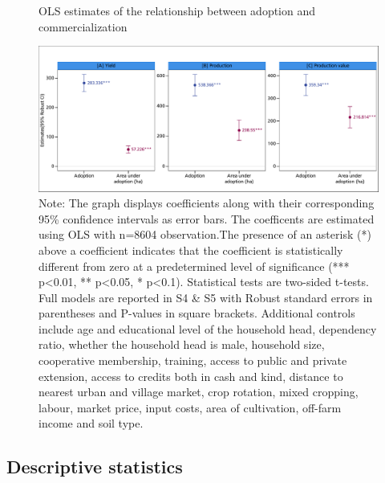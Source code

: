 \documentclass[
]{article}
\begin{document}
\begin{figure}[htbp]
\centering
\caption{OLS estimates of the relationship between adoption and commercialization}
\includegraphics[width=\textwidth]{figures/fig_SM2.pdf}
\caption*{
Note: The graph displays coefficients along with their corresponding 95\% confidence intervals as error bars. The coefficents are estimated using OLS with n=8604 observation.The presence of an asterisk (*) above a coefficient indicates that the coefficient is statistically different from zero at a predetermined level of significance (*** p<0.01, ** p<0.05, * p<0.1). Statistical tests are two-sided t-tests. Full models are reported in S4 \& S5 with  Robust standard errors in parentheses and P-values in square brackets. Additional controls include age and educational level of the household head, dependency ratio, whether the household head is male, household size, cooperative membership, training, access to public and private extension, access to credits both in  cash and kind, distance to nearest urban and village market, crop rotation, mixed cropping, labour, market price, input costs, area of cultivation, off-farm income and soil type.
}
\end{figure}

\newpage

\hypertarget{descriptive-statistics}{%
\subsection{Descriptive statistics}\label{descriptive-statistics}}
\end{document}
